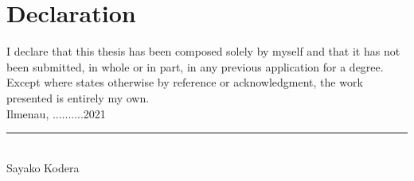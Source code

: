 \chapter*{Declaration}

\vspace*{1cm} %
I declare that this thesis has been composed solely by myself and that it has not been submitted, in whole or in part, in any previous application for a degree. Except where states otherwise by reference or acknowledgment, the work presented is entirely my own.\\[2cm]

Ilmenau, ..........2021  \hfill
\begin{minipage}[t]{7cm}\centering
    \rule{\linewidth}{.5pt}\\
    Sayako Kodera
\end{minipage}